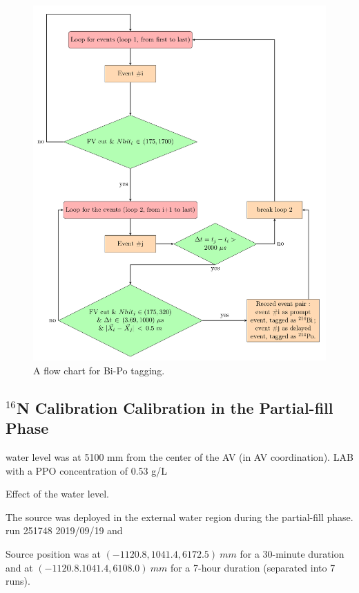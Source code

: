 \begin{figure}[!htb]
	\centering
	\includegraphics[width=15cm]{flowchart_latex.pdf}
	\caption{A flow chart for Bi-Po tagging.}
	\label{biPo_flowchart}
\end{figure}




\subsection{$^{16}$N Calibration Calibration in the Partial-fill Phase}

water level was at 5100 mm from the center of the AV (in AV coordination).
LAB with a PPO concentration of 0.53 g/L  

Effect of the water level.



The  source was deployed in the external water region during the partial-fill phase.
run 251748 2019/09/19 and 

Source position was at $(-1120.8, 1041.4, 6172.5)~ mm$ for a 30-minute duration and at $(-1120.8. 1041.4, 6108.0)~mm$ for a 7-hour duration (separated into 7 runs).





